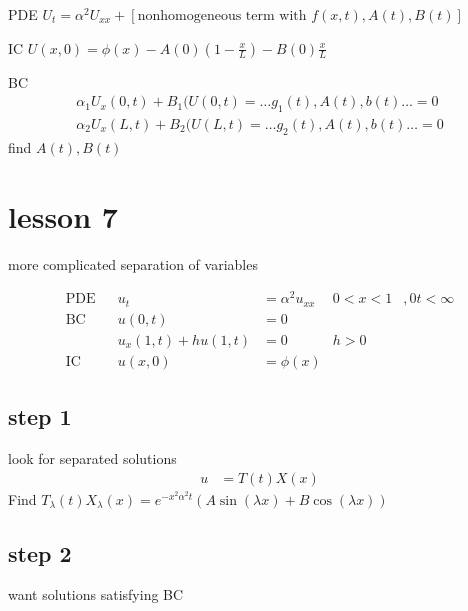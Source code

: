\documentclass{article}
\begin{document}
PDE $U_t=\alpha^2U_{xx}+[\text{nonhomogeneous term with }f(x,t),A(t),B(t)]$

IC $U(x,0)=\phi(x) -A(0)\left(1-\frac{x}{L}\right) -B(0)\frac{x}{L}$

BC 
\begin{align*}
  \alpha_1U_x(0,t)+B_1(U(0,t)=\dots g_1(t),A(t),b(t)\dots=0\\
  \alpha_2U_x(L,t)+B_2(U(L,t)=\dots g_2(t),A(t),b(t)\dots=0
\end{align*}
find $A(t),B(t)$
\section*{lesson 7}
more complicated separation of variables

\begin{align*}
  \text{PDE}&& u_t&=\alpha^2u_{xx}&0<x<1&,0t<\infty\\
  \text{BC}&& u(0,t)&=0\\
  && u_x(1,t)+hu(1,t)&=0 & h>0\\
  \text{IC}&& u(x,0)&=\phi(x)
\end{align*}
\subsection*{step 1}
look for separated solutions
\begin{align*}
  u&=T(t)X(x)
\end{align*}
Find $T_\lambda(t)X_\lambda(x)=e^{-x^2\alpha^2 t}(A\sin(\lambda x)+B\cos(\lambda x))$
\subsection*{step 2}
want solutions satisfying BC
\end{document}
